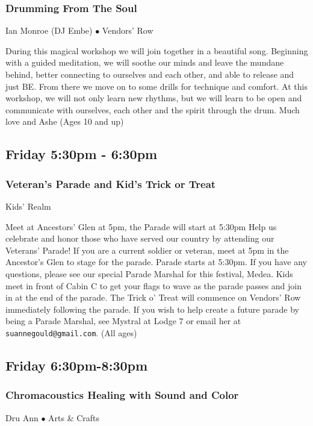 \subsubsection{Drumming From The Soul}
\label{Fri-Embe1}
{\small Ian Monroe (DJ Embe) $\bullet$  Vendors' Row}

 During this magical workshop we will join together in a beautiful song. Beginning with a guided meditation, we will soothe our minds and leave the mundane behind, better connecting to ourselves and each other, and able to release and just BE. From there we move on to some drills for technique and comfort.  At this workshop, we will not only learn new rhythms, but we will learn to be open and communicate with ourselves, each other and the spirit through the drum. Much love and Ashe {\small (Ages 10 and up)}

\subsection{Friday 5:30pm - 6:30pm}

\subsubsection{Veteran's Parade and Kid's Trick or Treat}
\label{Fri-Parade}
{\small  Kids' Realm}

 {\footnotesize Meet at Ancestors' Glen at 5pm, the Parade will start at 5:30pm}
Help us celebrate and honor those who have served our country by attending our Veterans' Parade! If you are a current soldier or veteran, meet at 5pm in the Ancestor's Glen to stage for the parade.  Parade starts at 5:30pm.  If you have any questions, please see our special Parade Marshal for this festival, Medea.
Kids meet in front of Cabin C to get your flags to wave as the parade passes and join in at the end of the parade.  The Trick o' Treat will commence on Vendors' Row immediately following the parade.
If you wish to help create a future parade by being a Parade Marshal, see Mystral at Lodge 7 or email her at  \texttt{suannegould@gmail.com}. {\small (All ages)}

\subsection{Friday 6:30pm-8:30pm}

\subsubsection{Chromacoustics Healing with Sound and Color}
\label{Fri-DruAnn2}
{\small Dru Ann $\bullet$  Arts \& Crafts}

